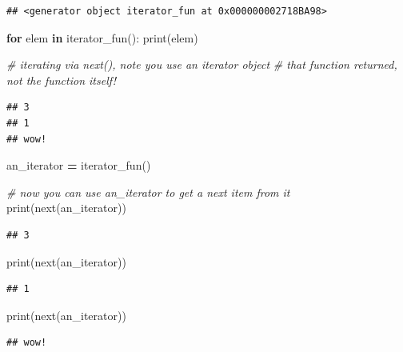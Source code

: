 \documentclass[
]{book}
\newenvironment{Shaded}{\begin{snugshade}}{\end{snugshade}}
\newcommand{\BuiltInTok}[1]{#1}
\newcommand{\CommentTok}[1]{\textcolor[rgb]{0.56,0.35,0.01}{\textit{#1}}}
\newcommand{\ControlFlowTok}[1]{\textcolor[rgb]{0.13,0.29,0.53}{\textbf{#1}}}
\newcommand{\KeywordTok}[1]{\textcolor[rgb]{0.13,0.29,0.53}{\textbf{#1}}}
\newcommand{\NormalTok}[1]{#1}
\newcommand{\OperatorTok}[1]{\textcolor[rgb]{0.81,0.36,0.00}{\textbf{#1}}}
\begin{document}
\begin{verbatim}
## <generator object iterator_fun at 0x000000002718BA98>
\end{verbatim}

\begin{Shaded}
\begin{Highlighting}[]
\ControlFlowTok{for}\NormalTok{ elem }\KeywordTok{in}\NormalTok{ iterator\_fun():}
    \BuiltInTok{print}\NormalTok{(elem)}
    
\CommentTok{\# iterating via next(), note you use an iterator object }
\CommentTok{\# that function returned, not the function itself!}
\end{Highlighting}
\end{Shaded}

\begin{verbatim}
## 3
## 1
## wow!
\end{verbatim}

\begin{Shaded}
\begin{Highlighting}[]
\NormalTok{an\_iterator }\OperatorTok{=}\NormalTok{ iterator\_fun()  }

\CommentTok{\# now you can use an\_iterator to get a next item from it}
\BuiltInTok{print}\NormalTok{(}\BuiltInTok{next}\NormalTok{(an\_iterator))}
\end{Highlighting}
\end{Shaded}

\begin{verbatim}
## 3
\end{verbatim}

\begin{Shaded}
\begin{Highlighting}[]
\BuiltInTok{print}\NormalTok{(}\BuiltInTok{next}\NormalTok{(an\_iterator))}
\end{Highlighting}
\end{Shaded}

\begin{verbatim}
## 1
\end{verbatim}

\begin{Shaded}
\begin{Highlighting}[]
\BuiltInTok{print}\NormalTok{(}\BuiltInTok{next}\NormalTok{(an\_iterator))}
\end{Highlighting}
\end{Shaded}

\begin{verbatim}
## wow!
\end{verbatim}
\end{document}
